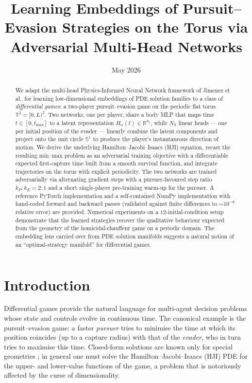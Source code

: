 \documentclass[11pt]{article}
\title{\bf Learning Embeddings of Pursuit--Evasion Strategies on the
            Torus via Adversarial Multi-Head Networks}
\author{}
\date{May 2026}
\newcommand{\TT}{\mathbb{T}^{2}}
\newcommand{\RR}{\mathbb{R}}
\begin{document}
\maketitle

\begin{abstract}
We adapt the multi-head Physics-Informed Neural Network framework of
Jimenez et al.\ for learning low-dimensional embeddings of PDE solution
families to a class of \emph{differential games}: a two-player
pursuit--evasion game on the periodic flat torus $\TT=[0,L)^2$.
Two networks, one per player, share a body MLP that maps time
$t\in[0,t_{\max}]$ to a latent representation $H_\alpha(t)\in\RR^{n_b}$,
while $N_h$ linear heads --- one per initial position of the evader ---
linearly combine the latent components and project onto the unit circle
$\mathbb{S}^1$ to produce the player's instantaneous direction of motion.
We derive the underlying Hamilton--Jacobi--Isaacs (HJI) equation, recast
the resulting min--max problem as an adversarial training objective with
a differentiable expected first-capture time built from a smooth survival
function, and integrate trajectories on the torus with explicit
periodicity.  The two networks are trained adversarially via alternating
gradient steps with a pursuer-favoured step ratio $k_P\!:\!k_E\!=\!2\!:\!1$
and a short single-player pre-training warm-up for the pursuer.
A reference PyTorch implementation and a self-contained NumPy
implementation with hand-coded forward and backward passes
(validated against finite differences to $\sim 10^{-8}$ relative error)
are provided.  Numerical experiments on a $12$-initial-condition setup
demonstrate that the learned strategies recover the qualitative
behaviour expected from the geometry of the homicidal-chauffeur game on
a periodic domain.  The embedding lens carried over from PDE solution
manifolds suggests a natural notion of an
``optimal-strategy manifold'' for differential games.
\end{abstract}

\tableofcontents

\section{Introduction}
Differential games \citep{Isaacs1965} provide the natural language for
multi-agent decision problems whose state and controls evolve in continuous
time.  The canonical example is the pursuit--evasion game: a faster
\emph{pursuer} tries to minimise the time at which its position
coincides (up to a capture radius) with that of the \emph{evader}, who
in turn tries to maximise this time.  Closed-form solutions are known
only for special geometries
\citep{Isaacs1965, basar1999dynamic, lewin2012differential};
in general one must solve the Hamilton--Jacobi--Isaacs (HJI) PDE for
the upper- and lower-value functions of the game, a problem that is
notoriously affected by the curse of dimensionality.
\end{document}
